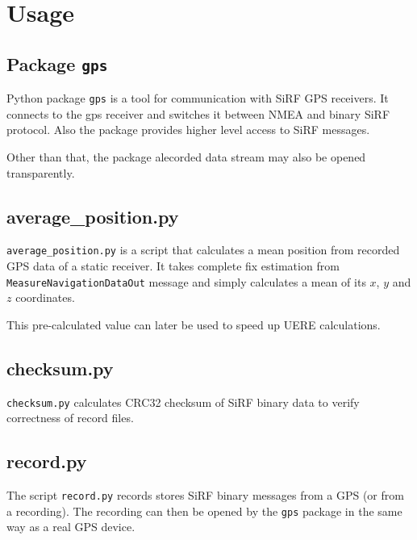 \chapter{Usage}
\label{chap:usage}

\section{Package \lstinline=gps=}
\label{sec:package-gps}

Python package \lstinline=gps= is a tool for communication with SiRF GPS receivers.
It connects to the gps receiver and switches it between NMEA and binary SiRF protocol.
Also the package provides higher level access to SiRF messages.

Other than that, the package alecorded data stream may also be opened transparently.

\section{average\_position.py}
\label{sec:usage-average-position-py}



\verb=average_position.py= is a script that calculates a mean position from recorded
GPS data of a static receiver.
It takes complete fix estimation from \verb=MeasureNavigationDataOut= message and simply
calculates a mean of its \(x\), \(y\) and \(z\) coordinates.

This pre-calculated value can later be used to speed up UERE calculations.

\section{checksum.py}
\label{sec:usage-checksum-py}



\verb=checksum.py= calculates CRC32 checksum of SiRF binary data to verify
correctness of record files.

\section{record.py}



The script \verb=record.py= records stores SiRF binary messages from a GPS (or from a recording).
The recording can then be opened by the \lstinline=gps= package in the same way as a real GPS
device.

